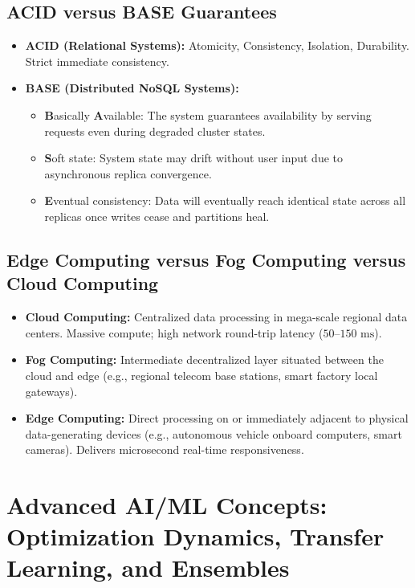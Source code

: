 \subsection{ACID versus BASE Guarantees}
\begin{itemize}
    \item \textbf{ACID (Relational Systems):} Atomicity, Consistency, Isolation, Durability. Strict immediate consistency.
    \item \textbf{BASE (Distributed NoSQL Systems):}
    \begin{itemize}
        \item \textbf{B}asically \textbf{A}vailable: The system guarantees availability by serving requests even during degraded cluster states.
        \item \textbf{S}oft state: System state may drift without user input due to asynchronous replica convergence.
        \item \textbf{E}ventual consistency: Data will eventually reach identical state across all replicas once writes cease and partitions heal.
    \end{itemize}
\end{itemize}

\subsection{Edge Computing versus Fog Computing versus Cloud Computing}
\begin{itemize}
    \item \textbf{Cloud Computing:} Centralized data processing in mega-scale regional data centers. Massive compute; high network round-trip latency ($50\text{--}150\text{ ms}$).
    \item \textbf{Fog Computing:} Intermediate decentralized layer situated between the cloud and edge (e.g., regional telecom base stations, smart factory local gateways).
    \item \textbf{Edge Computing:} Direct processing on or immediately adjacent to physical data-generating devices (e.g., autonomous vehicle onboard computers, smart cameras). Delivers microsecond real-time responsiveness.
\end{itemize}


\section{Advanced AI/ML Concepts: Optimization Dynamics, Transfer Learning, and Ensembles}
\label{sec:advanced_aiml_concepts}

